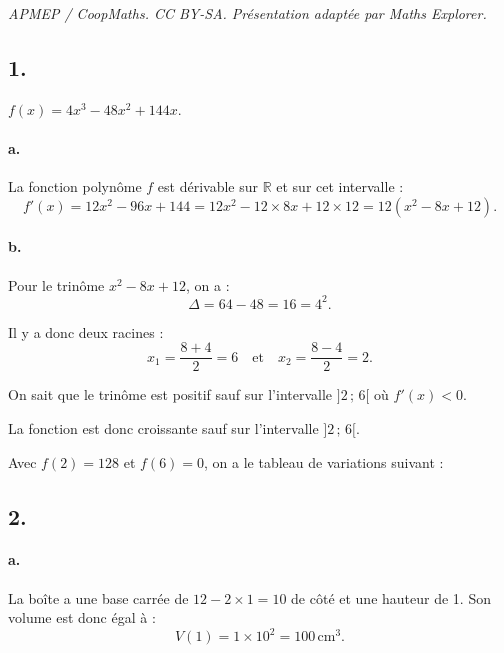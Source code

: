 \documentclass[10pt]{article}
\begin{document}
\noindent\textit{APMEP / CoopMaths. CC BY-SA. Présentation adaptée par Maths Explorer.}\par\medskip
\subsection*{1.}

\(f(x) = 4x^3 - 48x^2 + 144x\).

\paragraph{a.} La fonction polynôme \( f \) est dérivable sur \( \mathbb{R} \) et sur cet intervalle :
\[
f'(x) = 12x^2 - 96x + 144 = 12x^2 - 12 \times 8x + 12 \times 12 = 12(x^2 - 8x + 12).
\]

\paragraph{b.} Pour le trinôme \( x^2 - 8x + 12 \), on a :
\[
\Delta = 64 - 48 = 16 = 4^2.
\]

Il y a donc deux racines :
\[
x_1 = \dfrac{8 + 4}{2} = 6 \quad \text{et} \quad x_2 = \dfrac{8 - 4}{2} = 2.
\]

On sait que le trinôme est positif sauf sur l'intervalle \( ]2\,;\,6[ \) où \( f'(x) < 0 \).

La fonction est donc croissante sauf sur l'intervalle \( ]2\,;\,6[ \).

Avec \( f(2) = 128 \) et \( f(6) = 0 \), on a le tableau de variations suivant :
\begin{center}
\end{center}

\subsection*{2.}

\paragraph{a.} La boîte a une base carrée de \( 12 - 2 \times 1 = 10 \) de côté et une hauteur de 1. Son volume est donc égal à :
\[
V(1) = 1 \times 10^2 = 100 \, \text{cm}^3.
\]
\end{document}
